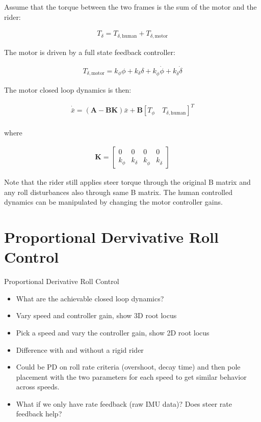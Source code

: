\documentclass[12pt]{article}
\begin{document}
Assume that the torque between the two frames is the sum of the motor and the
rider:

\begin{align}
  T_\delta = T_{\delta,\textrm{human}} + T_{\delta,\textrm{motor}}
\end{align}

The motor is driven by a full state feedback controller:

\begin{align}
  T_{\delta,\textrm{motor}} =
  k_\phi \phi +
  k_\delta \delta +
  k_{\dot{\phi}} \dot{\phi} +
  k_{\dot{\delta}} \dot{\delta}
\end{align}

The motor closed loop dynamics is then:

\begin{align}
  \dot{\bar{x}} = \left( \mathbf{A} - \mathbf{B} \mathbf{K} \right) \bar{x} +
  \mathbf{B} \left[ T_\phi \quad T_{\delta,\textrm{human}} \right]^T \\
\end{align}

where

\begin{align}
  \mathbf{K} =
  \begin{bmatrix}
    0 & 0 & 0 & 0 \\
    k_\phi & k_\delta & k_{\dot{\phi}} & k_{\dot{\delta}}
  \end{bmatrix}
\end{align}

Note that the rider still applies steer torque through the original B matrix
and any roll disturbances also through same B matrix. The human controlled
dynamics can be manipulated by changing the motor controller gains.

\section{Proportional Dervivative Roll Control}

Proportional Derivative Roll Control

\begin{itemize}
  \item What are the achievable closed loop dynamics?
  \item Vary speed and controller gain, show 3D root locus
  \item Pick a speed and vary the controller gain, show 2D root locus
  \item Difference with and without a rigid rider
  \item Could be PD on roll rate criteria (overshoot, decay time) and then pole
    placement with the two parameters for each speed to get similar behavior
    across speeds.
  \item What if we only have rate feedback (raw IMU data)? Does steer rate
    feedback help?
\end{itemize}
\end{document}
